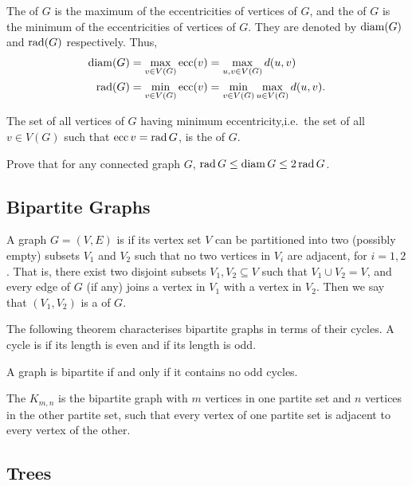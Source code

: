 The  of $G$ is the maximum of the eccentricities of vertices of $G$, and the  of $G$ is the minimum of the eccentricities of vertices of $G$. They are denoted by $\operatorname{diam}(G)$ and $\operatorname{rad}(G)$ respectively. Thus,
\begin{align*}
    \operatorname{diam}(G) & = \max_{v \in V(G)} \operatorname{ecc}(v)= \max_{u, v \in V(G)} d(u, v) \\
    \operatorname{rad}(G) & = \min_{v \in V(G)}\operatorname{ecc}(v) = \min_{v \in V(G)} \max_{u \in V(G)} d(u, v).
\end{align*}

The set of all vertices of $G$ having minimum eccentricity,i.e.\ the set of all $v \in V(G)$ such that $\operatorname{ecc} v = \operatorname{rad} G$, is the  of $G$.

\begin{Exercise}
Prove that for any connected graph $G$, $\operatorname{rad} G \le \operatorname{diam} G \le 2 \operatorname{rad} G$.
\end{Exercise}


\subsection{Bipartite Graphs}\label{subsec:Bipartite}

A graph $G = (V, E)$ is  if its vertex set $V$ can be partitioned into two (possibly empty) subsets $V_1$ and $V_2$ such that no two vertices in $V_i$ are adjacent, for $i = 1, 2$. That is, there exist two disjoint subsets $V_1, V_2 \subseteq V$ such that $V_1 \cup V_2 = V$, and every edge of $G$ (if any) joins a vertex in $V_1$ with a vertex in $V_2$. Then we say that $(V_1, V_2)$ is a  of $G$.

The following theorem characterises bipartite graphs in terms of their cycles. A cycle is  if its length is even and  if its length is odd.

\begin{Theorem}
A graph is bipartite if and only if it contains no odd cycles.
\end{Theorem}

The  $K_{m,n}$ is the bipartite graph with $m$ vertices in one partite set and $n$ vertices in the other partite set, such that every vertex of one partite set is adjacent to every vertex of the other.

\subsection{Trees}\label{subsec:Trees}

